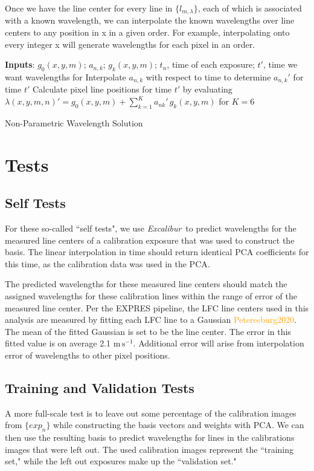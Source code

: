 \documentclass[12pt, letterpaper]{article}
\newcommand{\lz}[1]{\textcolor{orange}{#1}}
\newcommand{\project}[1]{\textsl{#1}}
\newcommand{\name}{\project{Excalibur}}
\newcommand{\mps}{\mathrm{m\,s^{-1}}}
\begin{document}
Once we have the line center for every line in $\{l_{m,\lambda}\}$, each of which is associated with a known wavelength, we can interpolate  the known wavelengths over line centers to any position in x in a given order.  For example, interpolating onto every integer x will generate wavelengths for each pixel in an order.
\begin{algorithm}
\SetAlgoLined
\textbf{Inputs}: $g_0(x,y,m)$; $a_{n,k}$; $g_k(x,y,m)$; $t_n$, time of each exposure; $t'$, time we want wavelengths for\;
Interpolate $a_{n,k}$ with respect to time to determine $a_{n,k}'$ for time $t'$\;
Calculate pixel line positions for time $t'$ by evaluating\;
$\lambda(x,y,m,n)' = g_0(x,y,m) + \sum_{k=1}^K a_{nk}'\,g_k(x,y,m)$ for $K=6$\;
\caption{Non-Parametric Wavelength Solution}
\end{algorithm}

\section{Tests}
\subsection{Self Tests} \label{sec:test-self}
For these so-called ``self tests", we use \name\ to  predict wavelengths for the measured line centers of a calibration exposure that was used to construct the basis.  The linear interpolation in time should return identical PCA coefficients for this time, as the calibration data was used in the PCA.

The predicted wavelengths for these measured line centers should match the assigned wavelengths for these calibration lines within the range of error of the measured line center.  Per the EXPRES pipeline, the LFC line centers used in this analysis are measured by fitting each LFC line to a Gaussian \lz{Peteresburg2020}.  The mean of the fitted Gaussian is set to be the line center.  The error in this fitted value is on average 2.1 $\mps$.  Additional error will arise from interpolation error of wavelengths to other pixel positions.  

\subsection{Training and Validation Tests} \label{sec:test-trainNvalid}
A more full-scale test is to leave out some percentage of the calibration images from $\{exp_n\}$ while constructing the basis vectors and weights with PCA.  We can then use the resulting basis to predict wavelengths for lines in the calibrations images that were left out.  The used calibration images represent the ``training set," while the left out exposures make up the ``validation set."
\end{document}
